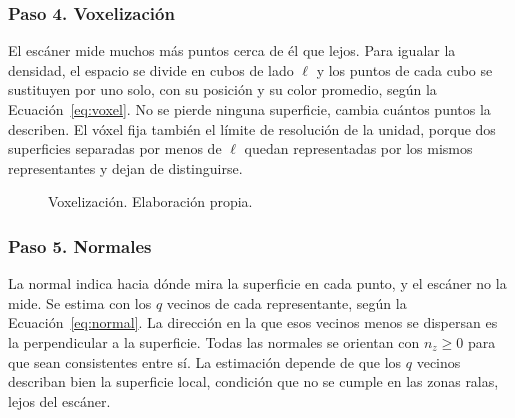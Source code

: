 \FloatBarrier
\subsubsection*{Paso 4. Voxelización}
\label{sec:u1-p4}

El escáner mide muchos más puntos cerca de él que lejos. Para igualar la
densidad, el espacio se divide en cubos de lado $\ell$ y los puntos de cada
cubo se sustituyen por uno solo, con su posición y su color promedio, según la
Ecuación~\ref{eq:voxel}. No se pierde ninguna superficie, cambia cuántos puntos
la describen. El vóxel fija también el límite de resolución de la unidad, porque
dos superficies separadas por menos de $\ell$ quedan representadas por los
mismos representantes y dejan de distinguirse.

\begin{figure}[!htbp]
\centering{}
\caption[Voxelización]{Voxelización. Elaboración propia.}
\end{figure}

\FloatBarrier
\subsubsection*{Paso 5. Normales}
\label{sec:u1-p5}

La normal indica hacia dónde mira la superficie en cada punto, y el escáner no
la mide. Se estima con los $q$ vecinos de cada representante, según la
Ecuación~\ref{eq:normal}. La dirección en la que esos vecinos menos se dispersan
es la perpendicular a la superficie. Todas las normales se orientan con
$n_z\geq 0$ para que sean consistentes entre sí. La estimación depende de que
los $q$ vecinos describan bien la superficie local, condición que no se cumple en
las zonas ralas, lejos del escáner.


